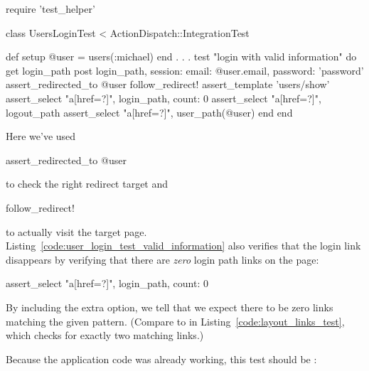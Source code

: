 \begin{codelisting}
\label{code:user_login_test_valid_information}
\begin{code}
require 'test_helper'

class UsersLoginTest < ActionDispatch::IntegrationTest

  def setup
    @user = users(:michael)
  end
  .
  .
  .
  test "login with valid information" do
    get login_path
    post login_path, session: { email: @user.email, password: 'password' }
    assert_redirected_to @user
    follow_redirect!
    assert_template 'users/show'
    assert_select "a[href=?]", login_path, count: 0
    assert_select "a[href=?]", logout_path
    assert_select "a[href=?]", user_path(@user)
  end
end
\end{code}
\end{codelisting}

\noindent Here we've used

\begin{code}
assert_redirected_to @user
\end{code}

\noindent to check the right redirect target and

\begin{code}
follow_redirect!
\end{code}

\noindent to actually visit the target page. Listing~\ref{code:user_login_test_valid_information} also verifies that the login link disappears by verifying that there are \emph{zero} login path links on the page:

\begin{code}
assert_select "a[href=?]", login_path, count: 0
\end{code}

\noindent By including the extra  option, we tell  that we expect there to be zero links matching the given pattern. (Compare to  in Listing~\ref{code:layout_links_test}, which checks for exactly two matching links.)

Because the application code was already working, this test should be \linebreak \passing:

\begin{codelisting}
\codecaption{\passing}
\end{codelisting}

